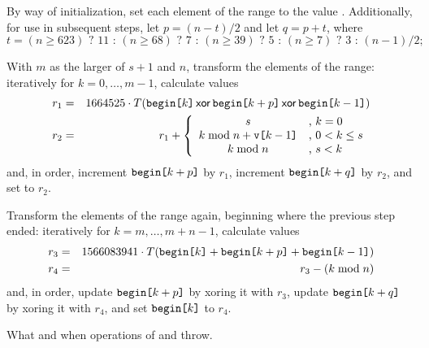 \begin{itemdescr}
\begin{enumeratea}
 \item
   By way of initialization,
   set each element of the range to the value .
   Additionally,
   for use in subsequent steps,
   let $p = (n - t) / 2$
   and let $q = p + t$,
   where
   \[%
     t = (n \ge 623) \mbox{ ? } 11 \mbox{ : } (n \ge 68) \mbox{ ? } 7 \mbox{ : } (n \ge 39) \mbox{ ? } 5 \mbox{ : } (n \ge 7) \mbox{ ? } 3 \mbox{ : } (n - 1)/2;
   \]%
 \item
   With $m$ as the larger of $s + 1$ and $n$,
   transform the elements of the range:
   iteratively for $k = 0, \dotsc, m - 1$,
   calculate values
   \begin{eqnarray*}
     r_1 & = &
       1664525 \cdot T(    \texttt{begin[}k\texttt{]}
                      \, \mathsf{xor} \, \texttt{begin[}k+p\texttt{]}
                      \, \mathsf{xor} \, \texttt{begin[}k-1 \texttt{]}
                      )
     \\
     r_2 & = & r_1 + \left\{
       \begin{array}{cl}
         s                                  & \mbox{,  } k = 0
         \\
         k \bmod n + \texttt{v[}k-1\texttt{]} & \mbox{,  } 0 < k \le s
         \\
         k \bmod n                          & \mbox{,  } s < k
       \end{array}
     \right.
   \end{eqnarray*}
   and, in order,
   increment $\texttt{begin[}k+p\texttt{]}$ by $r_1$,
   increment $\texttt{begin[}k+q\texttt{]}$ by $r_2$,
   and
   set  to $r_2$.
 \item
   Transform the elements of the range again,
   beginning where the previous step ended:
   iteratively for $k = m, \dotsc, m + n - 1$,
   calculate values
   \begin{eqnarray*}
     r_3 & = &
       1566083941 \cdot T( \texttt{begin[}k  \texttt{]}
                         + \texttt{begin[}k+p\texttt{]}
                         + \texttt{begin[}k-1\texttt{]}
                         )
     \\
     r_4 & = & r_3 - (k \bmod n)
   \end{eqnarray*}
   and, in order,
   \noindent
   update $\texttt{begin[}k+p\texttt{]}$ by xoring it with $r_3$,
   update $\texttt{begin[}k+q\texttt{]}$ by xoring it with $r_4$,
   and
   set $\texttt{begin[}k\texttt{]}$ to $r_4$.
\end{enumeratea}

\pnum\throws
What and when  operations of 
and  throw.
\end{itemdescr}


